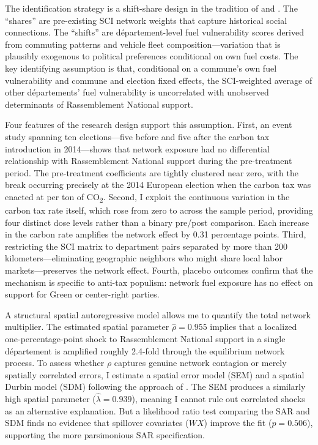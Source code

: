 \documentclass[12pt]{article}
\providecommand{\euro}{\texteuro}
\newcommand{\rn}{Rassemblement National}
\newcommand{\dept}{d\'{e}partement}
\newcommand{\depts}{d\'{e}partements}
\begin{document}
The identification strategy is a shift-share design in the tradition of \citet{goldsmith2020bartik} and \citet{borusyak2022quasi}. The ``shares'' are pre-existing SCI network weights that capture historical social connections. The ``shifts'' are \dept{}-level fuel vulnerability scores derived from commuting patterns and vehicle fleet composition---variation that is plausibly exogenous to political preferences conditional on own fuel costs. The key identifying assumption is that, conditional on a commune's own fuel vulnerability and commune and election fixed effects, the SCI-weighted average of other \depts{}' fuel vulnerability is uncorrelated with unobserved determinants of \rn{} support.

Four features of the research design support this assumption. First, an event study spanning ten elections---five before and five after the carbon tax introduction in 2014---shows that network exposure had no differential relationship with \rn{} support during the pre-treatment period. The pre-treatment coefficients are tightly clustered near zero, with the break occurring precisely at the 2014 European election when the carbon tax was enacted at \euro 7 per ton of CO\textsubscript{2}. Second, I exploit the continuous variation in the carbon tax rate itself, which rose from zero to \euro 44.60 across the sample period, providing four distinct dose levels rather than a binary pre/post comparison. Each \euro 10 increase in the carbon rate amplifies the network effect by 0.31 percentage points. Third, restricting the SCI matrix to department pairs separated by more than 200 kilometers---eliminating geographic neighbors who might share local labor markets---preserves the network effect. Fourth, placebo outcomes confirm that the mechanism is specific to anti-tax populism: network fuel exposure has no effect on support for Green or center-right parties.

A structural spatial autoregressive model allows me to quantify the total network multiplier. The estimated spatial parameter $\hat{\rho} = 0.955$ implies that a localized one-percentage-point shock to \rn{} support in a single \dept{} is amplified roughly 2.4-fold through the equilibrium network process. To assess whether $\rho$ captures genuine network contagion or merely spatially correlated errors, I estimate a spatial error model (SEM) and a spatial Durbin model (SDM) following the approach of \citet{lesage2009introduction}. The SEM produces a similarly high spatial parameter ($\hat{\lambda} = 0.939$), meaning I cannot rule out correlated shocks as an alternative explanation. But a likelihood ratio test comparing the SAR and SDM finds no evidence that spillover covariates ($WX$) improve the fit ($p = 0.506$), supporting the more parsimonious SAR specification.
\end{document}
